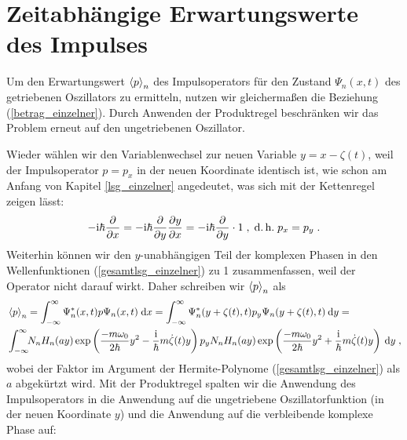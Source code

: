 




  \section{Zeitabhängige Erwartungswerte des Impulses}
    Um den Erwartungswert $\braket{p}_n$ des Impulsoperators für den Zustand $\Psi_n(x,t)$ des getriebenen Oszillators zu ermitteln, nutzen wir gleichermaßen die Beziehung (\ref{betrag_einzelner}).
    Durch Anwenden der Produktregel beschränken wir das Problem erneut auf den ungetriebenen Oszillator.

    Wieder wählen wir den Variablenwechsel zur neuen Variable $y=x-\zeta(t)$, weil der Impulsoperator $p=p_x$ in der neuen Koordinate identisch ist, wie schon am Anfang von Kapitel \ref{lsg_einzelner} angedeutet, was sich mit der Kettenregel zeigen lässt:
    \begin{equation}
      -\text i\hbar \frac{\partial}{\partial x} = -\text i\hbar \frac{\partial}{\partial y}\frac{\partial y}{\partial x} = -\text i\hbar \frac{\partial}{\partial y} \cdot 1 \; , \; \text{d.\,h.} \; p_x = p_y \; .
    \end{equation}
    Weiterhin können wir den $y$-unabhängigen Teil der komplexen Phasen in den Wellenfunktionen (\ref{gesamtlsg_einzelner}) zu 1 zusammenfassen, weil der Operator nicht darauf wirkt.
    Daher schreiben wir $\braket{p}_n$ als
    \begin{align}
      &\braket{p}_n = \int_{-\infty}^{\infty} \Psi^*_n(x,t) p \Psi_n(x,t) \; \text dx
      = \int_{-\infty}^{\infty} \Psi^*_n(y+\zeta(t),t) p_y \Psi_n(y+\zeta(t),t) \: \text dy= \notag\\
      &\int_{-\infty}^{\infty} \!\! N_nH_n(ay)\exp\left(\frac{-m\omega_0}{2\hbar}y^2-\frac{\text i}{\hbar}m\dot{\zeta}(t)y\right) p_y N_nH_n(ay)\exp\left(\frac{-m\omega_0}{2\hbar}y^2+\frac{\text i}{\hbar}m\dot{\zeta}(t)y\right) \: \text dy \; ,
      \label{spaste}
    \end{align}
    wobei der Faktor im Argument der Hermite-Polynome (\ref{gesamtlsg_einzelner}) als $a$ abgekürtzt wird.
    Mit der Produktregel spalten wir die Anwendung des Impulsoperators in die Anwendung auf die ungetriebene Oszillatorfunktion (in der neuen Koordinate $y$) und die Anwendung auf die verbleibende komplexe Phase auf:
